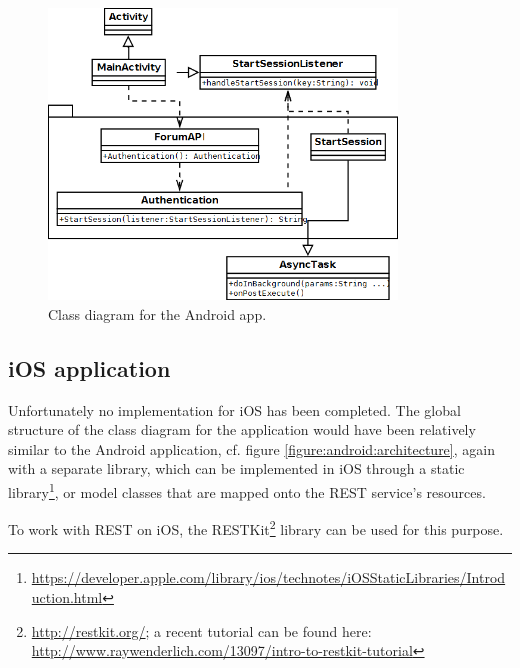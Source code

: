 



\begin{figure}
	\begin{center}
		\includegraphics[width=350px]{img/android_class_diagram}
		\caption{Class diagram for the Android app.}
		\label{figure:android:classdiagram}
	\end{center}
\end{figure}


\subsection{iOS application}

Unfortunately no implementation for iOS has been completed. The global structure of the class diagram for the application would have been relatively similar to the Android application, cf. figure \ref{figure:android:architecture}, again with a separate library, which can be implemented in iOS through a static library\footnote{\url{https://developer.apple.com/library/ios/technotes/iOSStaticLibraries/Introduction.html}}, or model classes that are mapped onto the REST service's resources.

To work with REST on iOS, the RESTKit\footnote{\url{http://restkit.org/}; a recent tutorial can be found here: \url{http://www.raywenderlich.com/13097/intro-to-restkit-tutorial}} library can be used for this purpose.



